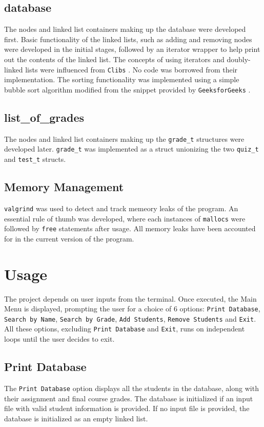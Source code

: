 \documentclass[usletter, 12pt]{article}
\begin{document}
        \subsection{database} The nodes and linked list containers making up
        the database were developed first. Basic functionality of the linked
        lists, such as adding and removing nodes were developed in the initial
        stages, followed by an iterator wrapper to help print out the contents
        of the linked list. The concepts of using iterators and doubly-linked
        lists were influenced from \texttt{Clibs} \cite{clibs}. No code was borrowed from
        their implementation. The sorting functionality was implemented using a
        simple bubble sort algorithm modified from the snippet provided by
        \texttt{GeeksforGeeks} \cite{gfg}.

        \subsection{list\_of\_grades} The nodes and linked list containers
        making up the \texttt{grade\_t} structures were developed later.
        \texttt{grade\_t} was implemented as a struct unionizing the two
        \texttt{quiz\_t} and \texttt{test\_t} structs.

        \subsection{Memory Management} \texttt{valgrind} was used to detect and
        track memeory leaks of the program. An essential rule of thumb was
        developed, where each instances of \texttt{mallocs} were followed by
        \texttt{free} statements after usage. All memory leaks have been
        accounted for in the current version of the program.

    \section{Usage}
    The project depends on user inputs from the terminal. Once executed, the
    Main Menu is displayed, prompting the user for a choice of 6 options:
    \texttt{Print Database}, \texttt{Search by Name}, \texttt{Search by Grade},
    \texttt{Add Students}, \texttt{Remove Students} and \texttt{Exit}. All
    these options, excluding \texttt{Print Database} and \texttt{Exit}, runs on
    independent loops until the user decides to exit.

        \subsection{Print Database} The \texttt{Print Database} option displays
        all the students in the database, along with their assignment and final
        course grades. The database is initialized if an input file with valid
        student information is provided. If no input file is provided, the
        database is initialized as an empty linked list.
\end{document}
